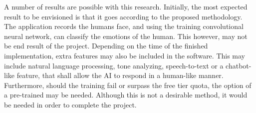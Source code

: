 
A number of results are possible with this research. Initially, the most expected result to be envisioned is that it goes according to the proposed methodology. The application records the humans face, and using the training convolutional neural network, can classify the emotions of the human. This however, may not be end result of the project. Depending on the time of the finished implementation, extra features may also be included in the software. This may include natural language processing, tone analyzing, speech-to-text or a chatbot-like feature, that shall allow the AI to respond in a human-like manner.
Furthermore, should the training fail or surpass the free tier quota, the option of a pre-trained may be needed. Although this is not a desirable method, it would be needed in order to complete the project.  

